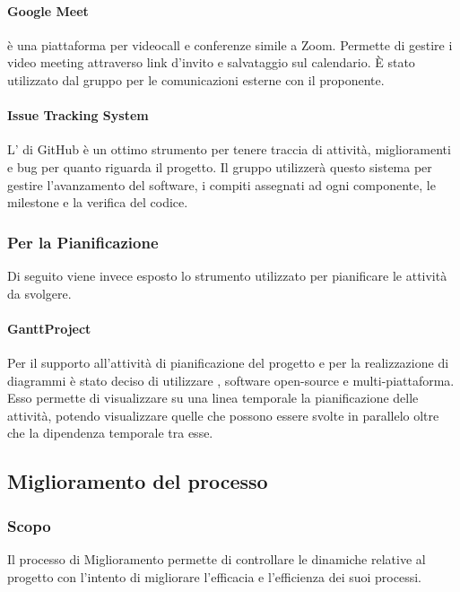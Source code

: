 \paragraph{Google Meet}
 è una piattaforma per videocall e conferenze simile a Zoom. Permette di gestire i video meeting attraverso link d'invito e salvataggio sul calendario. È stato utilizzato dal gruppo per le comunicazioni esterne con il proponente.

\paragraph{Issue Tracking System}
L' di GitHub è un ottimo strumento per tenere traccia di attività, miglioramenti e bug per quanto riguarda il progetto. Il gruppo utilizzerà questo sistema per gestire l'avanzamento del software, i compiti assegnati ad ogni componente, le milestone e la verifica del codice.

\subsubsection{Per la Pianificazione}
Di seguito viene invece esposto lo strumento utilizzato per pianificare le attività da svolgere.
\paragraph{GanttProject}
Per il supporto all’attività di pianificazione del progetto e per la realizzazione di diagrammi è stato deciso di utilizzare , software open-source e multi-piattaforma. Esso permette di visualizzare su una linea temporale la pianificazione delle attività, potendo visualizzare quelle che possono essere svolte in parallelo oltre che la dipendenza temporale tra esse.

\subsection{Miglioramento del processo} \label{_miglioramentoDelProcesso}
\subsubsection{Scopo}
Il processo di Miglioramento permette di controllare le dinamiche relative al progetto con l'intento di migliorare l'efficacia e l'efficienza dei suoi processi.
